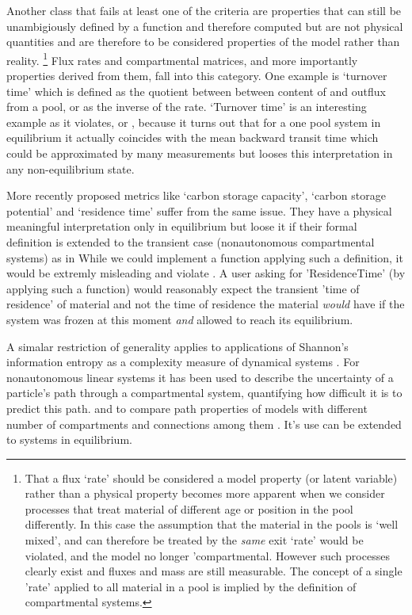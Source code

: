 Another class that fails at least one of the criteria
are properties that can still be unambigiously defined by a function and
therefore computed but are not physical quantities and are therefore to be
considered properties of the model rather than reality. 
\footnote{
  That a flux `rate' should be considered a model property (or latent variable)
  rather than a physical property becomes more apparent when we consider
  processes that treat material of different age or position in the pool
  differently.  In this case the assumption that the material in the pools is
  `well mixed', and can therefore be treated by the \emph{same} exit `rate'
  would be violated, and the model no longer 'compartmental.  However such
  processes clearly exist and fluxes and mass are still measurable.  The
  concept of a single 'rate' applied to all material in a pool is implied by
  the definition of compartmental systems.
} 
Flux rates and compartmental matrices, and more importantly properties derived from them, fall into  this category. 
One example is `turnover time' which is defined as the quotient between between content of and outflux from a pool, or as the inverse of the rate. 
`Turnover time' is an interesting example as it violates,  or , 
because it turns out that for a one pool system in equilibrium it actually coincides with the mean backward transit time
which could be approximated by many measurements but looses this interpretation in any non-equilibrium state.

More recently proposed metrics 
like `carbon storage capacity',  `carbon storage potential' and `residence time' suffer from the same issue.
They have a physical meaningful interpretation only in equilibrium 
but loose it if their formal definition is extended to the transient case (nonautonomous compartmental systems) as in \citep{2017}
While we could implement a function applying such a definition,  it would be extremly misleading and violate .
A user asking for  'ResidenceTime' (by applying such a function) would reasonably expect the transient 'time of residence' of material and not the time of residence the material  
\emph{would} have if the system was frozen at this moment \emph{and} allowed to reach its equilibrium.

A simalar restriction of generality applies to applications of Shannon's information entropy as a complexity measure 
of dynamical systems \citep{Ebeling1998}. For nonautonomous linear systems it has 
been used to describe the uncertainty of a particle's path through a
compartmental system, quantifying how difficult it is to predict this path. 
and to compare path properties of models with different number of
compartments and connections among them \citep{Metzler2020}. 
It's use can be extended to systems in equilibrium.

